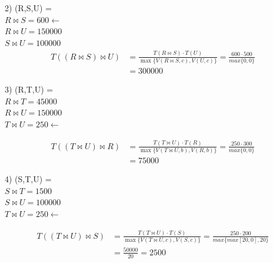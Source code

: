 \documentclass{templateNote}
\begin{document}
\begin{enumerate}
    2) (R,S,U) = \\
                \hspace*{0.25cm}$R \Join S = 600 \leftarrow$ \\
                \hspace*{0.25cm}$R \Join U = 150000$ \\
                \hspace*{0.25cm}$S \Join U = 100000$ \\

                \begin{align*}
                    T((R \Join S) \Join U) &= \frac{T(R \Join S)\cdot T(U)}{\max\{V(R \Join S,c),V(U,c)\}} = \frac{600\cdot500}{max\{0,0\}} \\ 
                    &= 300000
                \end{align*}

    3) (R,T,U) = \\
                \hspace*{0.25cm}$R \Join T = 45000$ \\
                \hspace*{0.25cm}$R \Join U = 150000$ \\
                \hspace*{0.25cm}$T \Join U = 250 \leftarrow$

                \begin{align*}
                    T((T \Join U) \Join R) &= \frac{T(T \Join U)\cdot T(R)}{\max\{V(T \Join U,b),V(R,b)\}} = \frac{250\cdot300}{max\{0,0\}} \\
                    &= 75000
                \end{align*}

    4) (S,T,U) = \\
                \hspace*{0.25cm}$S \Join T = 1500$ \\
                \hspace*{0.25cm}$S \Join U = 100000$ \\
                \hspace*{0.25cm}$T \Join U = 250 \leftarrow$

                \begin{align*}
                    T((T \Join U) \Join S) &= \frac{T(T \Join U) \cdot T(S)}{\max\{V(T \Join U,c), V(S,c)\}} = \frac{250\cdot200}{max\{max[20,0],20\}} \\
                    &= \frac{50000}{20} = 2500
                \end{align*}
    

\end{enumerate}
\end{document}
